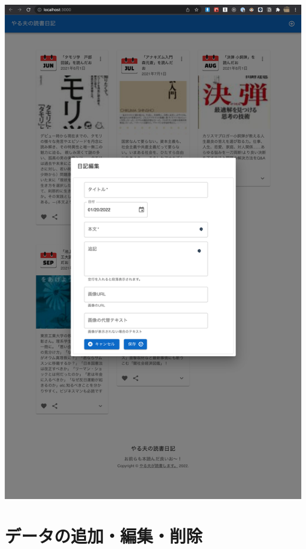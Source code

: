 \begin{reviewimage}%
\includegraphics[width=0.7\maxwidth]{./images/03-todo-with-react/mui018-DiaryForm-done.png}%
\label{image:03-todo-with-react:mui018-DiaryForm-done}
\end{reviewimage}

\section{データの追加・編集・削除}
\keeplastskip{
  \label{sec:3-4}
  \label{sec-034hooks}
  \par\nobreak
}

